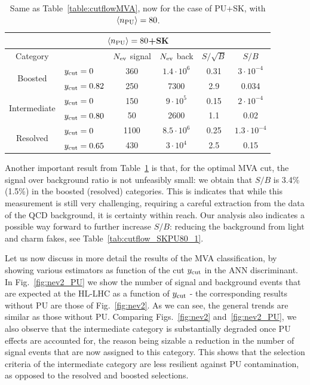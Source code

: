 \begin{table}[t]
  \centering
  \begin{tabular}{|c|l|c|c|c|c|}
     \multicolumn{6}{|c|}{$\left\langle n_{\rm PU}\right\rangle=80$+SK} \\
    \hline
    Category  &   &  $N_{\rm ev}$ signal &  $N_{\rm ev}$ back  &  $S/\sqrt{B}$ & $S/B$ \\ 
    \hline
    \hline
    \multirow{2}{*}{Boosted} &  $y_{\rm cut}=0$  & 360   &  $1.4\cdot 10^6$ & 0.31   &
     $3\cdot 10^{-4}$  \\
    &  $y_{\rm cut}=0.82$ &  250 & 7300  & 2.9    & 0.034  \\
    \hline
    \hline
    \multirow{2}{*}{Intermediate} &  $y_{\rm cut}=0$  &  150  & $9\cdot 10^5$    & 0.15    &
     $2\cdot 10^{-4}$ \\
    &  $y_{\rm cut}=0.80$ & 50 & 2600  &  1.1   & 0.02 \\
    \hline
    \hline
    \multirow{2}{*}{Resolved} &  $y_{\rm cut}=0$  &  1100  & $8.5\cdot 10^6$
    & 0.25    &  $1.3\cdot 10^{-4}$  \\
    &  $y_{\rm cut}=0.65$ & 430  & $3\cdot 10^4$  &  2.5   & 0.15  \\
    \hline
      \end{tabular}
  \caption{\small Same as Table~\ref{table:cutflowMVA}, now for the case
    of PU+SK, with $\left\langle n_{\rm PU}\right\rangle=80$.
        \label{table:cutflowMVA_PU}
  }
\end{table}

Another important result from Table~\ref{table:cutflowMVA_PU} is that,
for the optimal MVA cut, the signal over background ratio
is not unfeasibly small: we obtain that $S/B$ is 3.4\% (1.5\%)
in the boosted (resolved) categories.
%
This is indicates that while this measurement is still very challenging,
requiring a careful extraction from the data of the QCD
background, it is certainty within reach.
%
Our analysis also indicates a possible way forward to
further increase $S/B$: reducing the background from light and charm
fakes, see Table~\ref{tab:cutflow_SKPU80_1}.

Let us now discuss in more detail the results of the MVA
classification, by showing various estimators as function
of the cut $y_{\rm cut}$ in the ANN discriminant.
%
In Fig.~\ref{fig:nev2_PU}
we show the number of signal and background events that
are expected at the HL-LHC as a function of
$y_{\rm cut}$ -
the corresponding results without PU are those of
Fig.~\ref{fig:nev2}.
%
As we can see, the general trends are
similar as those without PU.
%
Comparing Figs.~\ref{fig:nev2} and~\ref{fig:nev2_PU}, we also observe
that the intermediate category is substantially degraded once PU effects
are accounted for, the reason being  sizable
a reduction in the number of signal
events that are now assigned to this category.
%
This shows that the selection criteria
of the intermediate category are less
resilient against PU contamination,
as opposed to the resolved and boosted selections.


